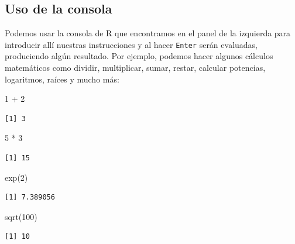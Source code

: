 \documentclass[
]{book}
\newenvironment{Shaded}{\begin{snugshade}}{\end{snugshade}}
\newcommand{\DecValTok}[1]{\textcolor[rgb]{0.00,0.00,0.81}{#1}}
\newcommand{\FunctionTok}[1]{\textcolor[rgb]{0.00,0.00,0.00}{#1}}
\newcommand{\NormalTok}[1]{#1}
\newcommand{\SpecialCharTok}[1]{\textcolor[rgb]{0.00,0.00,0.00}{#1}}
\begin{document}
\hypertarget{uso-de-la-consola}{%
\subsection{Uso de la consola}\label{uso-de-la-consola}}

Podemos usar la consola de R que encontramos en el panel de la izquierda para introducir allí nuestras instrucciones y al hacer \texttt{Enter} serán evaluadas, produciendo algún resultado. Por ejemplo, podemos hacer algunos cálculos matemáticos como dividir, multiplicar, sumar, restar, calcular potencias, logaritmos, raíces y mucho más:

\begin{Shaded}
\begin{Highlighting}[]
\DecValTok{1} \SpecialCharTok{+} \DecValTok{2}
\end{Highlighting}
\end{Shaded}

\begin{verbatim}
[1] 3
\end{verbatim}

\begin{Shaded}
\begin{Highlighting}[]
\DecValTok{5} \SpecialCharTok{*} \DecValTok{3}
\end{Highlighting}
\end{Shaded}

\begin{verbatim}
[1] 15
\end{verbatim}

\begin{Shaded}
\begin{Highlighting}[]
\FunctionTok{exp}\NormalTok{(}\DecValTok{2}\NormalTok{)}
\end{Highlighting}
\end{Shaded}

\begin{verbatim}
[1] 7.389056
\end{verbatim}

\begin{Shaded}
\begin{Highlighting}[]
\FunctionTok{sqrt}\NormalTok{(}\DecValTok{100}\NormalTok{)}
\end{Highlighting}
\end{Shaded}

\begin{verbatim}
[1] 10
\end{verbatim}
\end{document}
